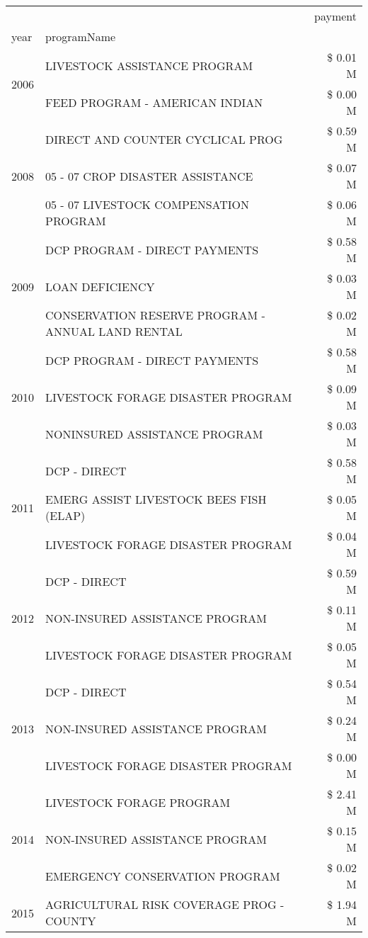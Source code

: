 \begin{tabular}{llr}
\toprule
 &  & payment \\
year & programName &  \\
\midrule
\multirow[t]{2}{*}{2006} & LIVESTOCK ASSISTANCE PROGRAM & \$ 0.01 M \\
 & FEED PROGRAM - AMERICAN INDIAN & \$ 0.00 M \\
\cline{1-3}
\multirow[t]{3}{*}{2008} & DIRECT AND COUNTER CYCLICAL PROG & \$ 0.59 M \\
 & 05 - 07 CROP DISASTER ASSISTANCE & \$ 0.07 M \\
 & 05 - 07 LIVESTOCK COMPENSATION PROGRAM & \$ 0.06 M \\
\cline{1-3}
\multirow[t]{3}{*}{2009} & DCP PROGRAM - DIRECT PAYMENTS & \$ 0.58 M \\
 & LOAN DEFICIENCY & \$ 0.03 M \\
 & CONSERVATION RESERVE PROGRAM - ANNUAL LAND RENTAL & \$ 0.02 M \\
\cline{1-3}
\multirow[t]{3}{*}{2010} & DCP PROGRAM - DIRECT PAYMENTS & \$ 0.58 M \\
 & LIVESTOCK FORAGE DISASTER  PROGRAM & \$ 0.09 M \\
 & NONINSURED ASSISTANCE PROGRAM & \$ 0.03 M \\
\cline{1-3}
\multirow[t]{3}{*}{2011} & DCP - DIRECT & \$ 0.58 M \\
 & EMERG ASSIST LIVESTOCK BEES FISH (ELAP) & \$ 0.05 M \\
 & LIVESTOCK FORAGE DISASTER PROGRAM & \$ 0.04 M \\
\cline{1-3}
\multirow[t]{3}{*}{2012} & DCP - DIRECT & \$ 0.59 M \\
 & NON-INSURED ASSISTANCE PROGRAM & \$ 0.11 M \\
 & LIVESTOCK FORAGE DISASTER PROGRAM & \$ 0.05 M \\
\cline{1-3}
\multirow[t]{3}{*}{2013} & DCP - DIRECT & \$ 0.54 M \\
 & NON-INSURED ASSISTANCE PROGRAM & \$ 0.24 M \\
 & LIVESTOCK FORAGE DISASTER PROGRAM & \$ 0.00 M \\
\cline{1-3}
\multirow[t]{3}{*}{2014} & LIVESTOCK FORAGE PROGRAM & \$ 2.41 M \\
 & NON-INSURED ASSISTANCE PROGRAM & \$ 0.15 M \\
 & EMERGENCY CONSERVATION PROGRAM & \$ 0.02 M \\
\cline{1-3}
\multirow[t]{3}{*}{2015} & AGRICULTURAL RISK COVERAGE PROG - COUNTY & \$ 1.94 M \\

\end{tabular}
